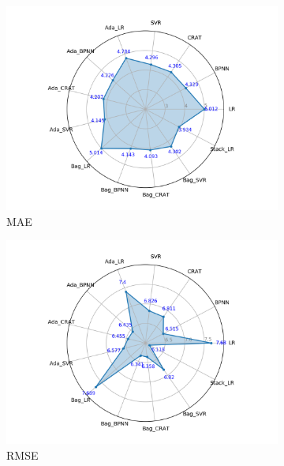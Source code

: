 \documentclass[11pt]{article}
\begin{document}
\begin{figure}[!h]
		\centering
		\begin{subfigure}{.53\textwidth}
			\centering
			\includegraphics[width = \linewidth]{MAEcircle.png}
			\caption{MAE}
		\end{subfigure}%
		\hspace{-3em}
		\begin{subfigure}{0.53\textwidth}
		\centering
		\includegraphics[width = \linewidth]{RMSEcircle.png}
		\caption{RMSE}
		\end{subfigure}%
		\hspace{1em}
		\begin{subfigure}{.53\textwidth}
			\centering

\end{subfigure}
\end{figure}
\end{document}

